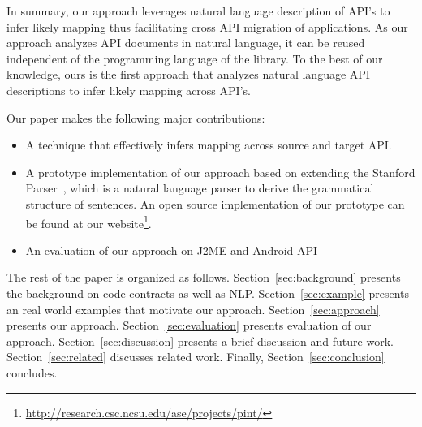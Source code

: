 In summary, our approach leverages natural language description of API's to infer likely mapping thus facilitating cross API migration of applications. As our approach analyzes API documents in natural language, it can be reused independent of the programming language of the library. To the best of our knowledge, ours is the first approach that analyzes natural language API descriptions to infer likely mapping across API's.

Our paper makes the following major contributions:
\begin{itemize}
	\item A technique that effectively infers mapping across source and target API.
	\item A prototype implementation of our approach based on extending the Stanford Parser~\cite{SNLP,SNLP1}, which is a natural language parser to derive the grammatical structure of sentences. An open source implementation of our prototype can be found at our website\footnote{\url{http://research.csc.ncsu.edu/ase/projects/pint/}}. 
	\item An evaluation of our approach on J2ME and Android API
\end{itemize}


The rest of the paper is organized as follows. Section~\ref{sec:background} presents the  background on code contracts as well as NLP. Section~\ref{sec:example} presents an real world examples that motivate our approach. Section~\ref{sec:approach} presents our approach. Section~\ref{sec:evaluation} presents evaluation of our approach. Section~\ref{sec:discussion} presents a brief discussion and future work. Section~\ref{sec:related} discusses related work. Finally, Section~\ref{sec:conclusion} concludes.


